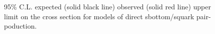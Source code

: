 \begin{figure}
\begin{center}
     \\
  \end{center}
\end{figure}

\begin{figure}
  \caption{95\% C.L. expected (solid black line) observed (solid red line) upper limit on the cross section for models of direct sbottom/squark pair-poduction.\label{fig:plane_xs_sbottom_squark}}
  \begin{center}    
     ~~
     \\
  \end{center}
\end{figure}





